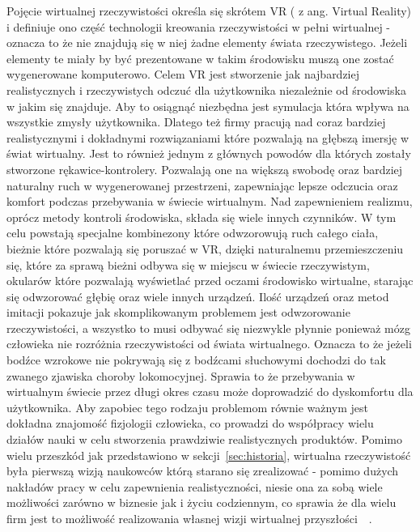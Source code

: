 	Pojęcie wirtualnej rzeczywistości określa się skrótem VR ( z ang. Virtual Reality) i definiuje ono część technologii kreowania rzeczywistości w pełni wirtualnej - oznacza to że nie znajdują się w niej żadne elementy świata rzeczywistego. Jeżeli elementy te miały by być prezentowane w takim środowisku muszą one zostać wygenerowane komputerowo. Celem VR jest stworzenie jak najbardziej realistycznych i rzeczywistych odczuć dla użytkownika niezależnie od środowiska w jakim się znajduje. Aby to osiągnąć niezbędna jest symulacja która wpływa na wszystkie zmysły użytkownika. Dlatego też firmy pracują nad coraz bardziej realistycznymi i dokładnymi rozwiązaniami które pozwalają na głębszą imersję w świat wirtualny. Jest to również jednym z głównych powodów dla których zostały stworzone rękawice-kontrolery. Pozwalają one na większą swobodę oraz bardziej naturalny ruch w  wygenerowanej przestrzeni, zapewniając lepsze odczucia oraz komfort podczas przebywania w świecie wirtualnym. Nad zapewnieniem realizmu, oprócz metody kontroli środowiska, składa się wiele innych czynników. W tym celu powstają specjalne kombinezony które odwzorowują ruch całego ciała, bieżnie które pozwalają się poruszać w VR, dzięki naturalnemu przemieszczeniu się, które za sprawą bieżni odbywa się w miejscu w świecie rzeczywistym, okularów które pozwalają wyświetlać przed oczami środowisko wirtualne, starając się odwzorować głębię oraz wiele innych urządzeń. Ilość urządzeń oraz metod imitacji pokazuje jak skomplikowanym problemem jest odwzorowanie rzeczywistości, a wszystko to musi odbywać się niezwykle płynnie ponieważ mózg człowieka nie rozróżnia rzeczywistości od świata wirtualnego. Oznacza to że jeżeli bodźce wzrokowe nie pokrywają się z bodźcami słuchowymi dochodzi do tak zwanego zjawiska choroby lokomocyjnej. Sprawia to że przebywania w wirtualnym świecie przez długi okres czasu może doprowadzić do dyskomfortu dla użytkownika. Aby zapobiec tego rodzaju problemom równie ważnym jest dokładna znajomość fizjologii człowieka, co prowadzi do współpracy wielu działów nauki w celu stworzenia prawdziwie realistycznych produktów. Pomimo wielu przeszkód jak przedstawiono w sekcji~\ref{sec:historia}, wirtualna rzeczywistość była pierwszą wizją naukowców którą starano się zrealizować - pomimo dużych nakładów pracy w celu zapewnienia realistyczności, niesie ona za sobą wiele możliwości zarówno w biznesie jak i życiu codziennym, co sprawia że dla wielu firm jest to możliwość realizowania własnej wizji wirtualnej przyszłości~\cite{terms}~\cite{chorobaVR}.
	
